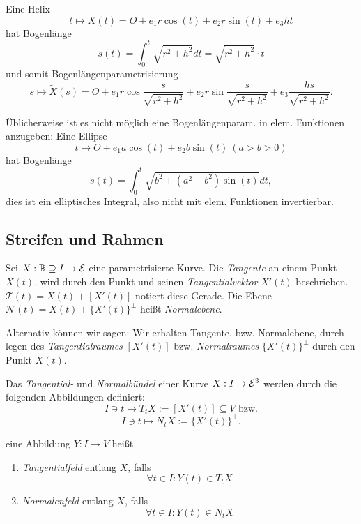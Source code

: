 \begin{example}
	Eine Helix \[t \mapsto X(t) = O + e_1r\cos(t)+e_2r\sin(t)+ e_3ht\]
	hat Bogenlänge \[s(t) = \int_{0}^{t} \sqrt{r^2 + h^2}dt = \sqrt{r^2+h^2} \cdot t\]
	und somit Bogenlängenparametrisierung \[s \mapsto \widetilde{X}(s)= O + e_1r\cos\frac{s}{\sqrt{r^2+h^2}}+e_2r\sin\frac{s}{\sqrt{r^2+h^2}}+ e_3\frac{hs}{\sqrt{r^2+h^2}}.\]
\end{example}

\begin{remark, example}
	
	Üblicherweise ist es nicht möglich eine Bogenlängenparam. in elem. Funktionen anzugeben: Eine Ellipse\[t \mapsto O + e_1a\cos(t)+e_2b\sin(t) ~ (a>b>0)\]
	hat Bogenlänge
	\[s(t) = \int_{0}^{t} \sqrt{b^2 + ( a^2-b^2)\sin(t)}dt,\]
	dies ist ein elliptisches Integral, also nicht mit elem. Funktionen invertierbar.

\end{remark, example}

\subsection{Streifen und Rahmen}

\begin{definition}
	
	Sei $X: \mathbb R \supseteq I \rightarrow \mathcal E$ eine parametrisierte Kurve.
	Die \emph{Tangente} an einem Punkt $X(t)$, wird durch den Punkt und seinen \emph{Tangentialvektor} $X'(t)$ beschrieben. $\mathcal{T}(t)=X(t) + [X'(t)]$ notiert diese Gerade.
	Die Ebene $\mathcal{N}(t)=X(t)+ \{X'(t)\}^\perp $ heißt \emph{Normalebene}.
	
	Alternativ können wir sagen: Wir erhalten Tangente, bzw. Normalebene, durch legen des \emph{Tangentialraumes} $[X'(t)]$ bzw. \emph{Normalraumes} $\{X'(t)\}^\perp$ durch den Punkt $X(t)$.
	
\end{definition}

\begin{definition}
	Das \emph{Tangential-} und \emph{Normalbündel} einer Kurve $X:I \rightarrow \mathcal E^3$ werden durch die folgenden Abbildungen definiert:
	\[I \ni t \mapsto T_tX := [X'(t)]\subseteq V \text{ bzw.}\]
	\[I \ni t \mapsto N_tX:= \{ X'(t) \}^\perp. \]
	
	eine Abbildung $Y: I \rightarrow V$ heißt
	\begin{enumerate}
		\item \emph{Tangentialfeld} entlang $X$, falls \[ \forall t \in I: Y(t) \in T_tX \]
		\item \emph{Normalenfeld} entlang $X$, falls \[  \forall t \in I: Y(t) \in N_tX \]
	\end{enumerate}
\end{definition}

